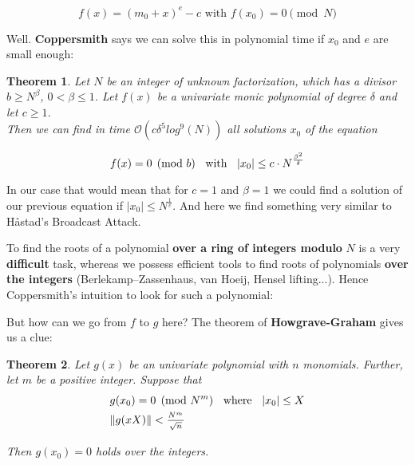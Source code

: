 \documentclass[a4paper,11pt]{article}
\newtheorem{theorem}{Theorem}
\begin{document}
\[ f(x) = (m_0 + x)^e - c \text{ with } f(x_0) = 0 \pmod{N} \]

Well. \textbf{Coppersmith} says we can solve this in polynomial time if $x_0$ and $e$ are small enough:

\begin{theorem}
Let $N$ be an integer of unknown factorization, which has a divisor $b \geq N^{\beta}$, $0 < \beta \leq 1$. Let $f(x)$ be a univariate monic polynomial of degree $\delta$ and let $c \geq 1$.\\
Then we can find in time $\mathcal{O}(c\delta^5log^9(N))$ all solutions $x_0$ of the equation

\[ f(x) = 0 \pmod{b} \hspace{2mm} \text{ with } \hspace{2mm} |x_0| \leq c \cdot N^{\frac{\beta^2}{\delta}} \]
\end{theorem}

In our case that would mean that for $c=1$ and $\beta=1$ we could find a solution of our previous equation if $|x_0| \leq N^{\frac{1}{e}}$. And here we find something very similar to Håstad's Broadcast Attack.

To find the roots of a polynomial \textbf{over a ring of integers modulo} $N$ is a very \textbf{difficult} task, whereas we possess efficient tools to find roots of  polynomials \textbf{over the integers} (Berlekamp–Zassenhaus, van Hoeij, Hensel lifting...). Hence Coppersmith's intuition to look for such a polynomial:



But how can we go from $f$ to $g$ here? The theorem of \textbf{Howgrave-Graham} gives us a clue:

\begin{theorem}
Let $g(x)$ be an univariate polynomial with $n$ monomials. Further, let $m$ be a positive integer. Suppose that
\setcounter{equation}{0}
\begin{align}
&g(x_0) = 0 \pmod{N^m} \hspace{2mm} \text{ where } \hspace{2mm} |x_0| \leq X\\
&\|g(xX)\| < \frac{_{N^m}}{^{\sqrt{n}}}
\end{align}

Then $g(x_0)=0$ holds over the integers.
\end{theorem}
\end{document}

